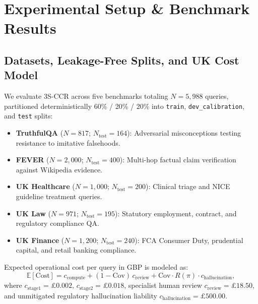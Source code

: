 \documentclass[10pt,conference]{IEEEtran}
\begin{document}
\section{Experimental Setup \& Benchmark Results}
\subsection{Datasets, Leakage-Free Splits, and UK Cost Model}
We evaluate 3S-CCR across five benchmarks totaling $N = 5,988$ queries, partitioned deterministically 60\% / 20\% / 20\% into \texttt{train}, \texttt{dev\_calibration}, and \texttt{test} splits:
\begin{itemize}
    \item \textbf{TruthfulQA} \cite{lin2022truthfulqa} ($N=817$; $N_{\text{test}}=164$): Adversarial misconceptions testing resistance to imitative falsehoods.
    \item \textbf{FEVER} \cite{thorne2018fever} ($N=2,000$; $N_{\text{test}}=400$): Multi-hop factual claim verification against Wikipedia evidence.
    \item \textbf{UK Healthcare} ($N=1,000$; $N_{\text{test}}=200$): Clinical triage and NICE guideline treatment queries.
    \item \textbf{UK Law} ($N=971$; $N_{\text{test}}=195$): Statutory employment, contract, and regulatory compliance QA.
    \item \textbf{UK Finance} ($N=1,200$; $N_{\text{test}}=240$): FCA Consumer Duty, prudential capital, and retail banking compliance.
\end{itemize}

Expected operational cost per query in GBP is modeled as:
\begin{equation}
    \mathbb{E}[\text{Cost}] = c_{\text{compute}} + (1 - \mathrm{Cov})\,c_{\text{review}} + \mathrm{Cov}\cdot R(\pi)\cdot c_{\text{hallucination}},
\end{equation}
where $c_{\text{stage1}} = \pounds0.002$, $c_{\text{stage2}} = \pounds0.018$, specialist human review $c_{\text{review}} = \pounds18.50$, and unmitigated regulatory hallucination liability $c_{\text{hallucination}} = \pounds500.00$.
\end{document}
